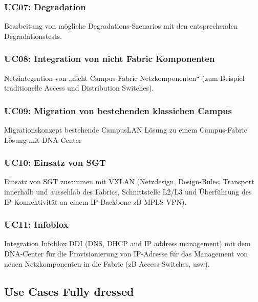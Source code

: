 \subsubsection{UC07: Degradation}
Bearbeitung von mögliche Degradations-Szenarios mit den entsprechenden Degradationstests.

\subsubsection{UC08: Integration von nicht Fabric Komponenten}
Netzintegration von „nicht Campus-Fabric Netzkomponenten“ (zum Beispiel traditionelle Access und Distribution Switches).

\subsubsection{UC09:  Migration von bestehenden klassichen Campus}
Migrationskonzept bestehende CampusLAN Lösung zu einem Campus-Fabric Lösung mit DNA-Center

\subsubsection{UC10: Einsatz von SGT}
Einsatz von SGT zusammen mit VXLAN (Netzdesign, Design-Rules, Transport innerhalb und aussehlab des Fabrics, Schnittstelle L2/L3 und Überführung des IP-Konnektivität an einem IP-Backbone zB MPLS VPN).

\subsubsection{UC11: Infoblox}
Integration Infoblox DDI (DNS, DHCP and IP address management) mit dem DNA-Center für die Provisionierung von IP-Adresse für das Management von neuen Netzkomponenten in die Fabric (zB Access-Switches, usw).

\subsection{Use Cases Fully dressed}
